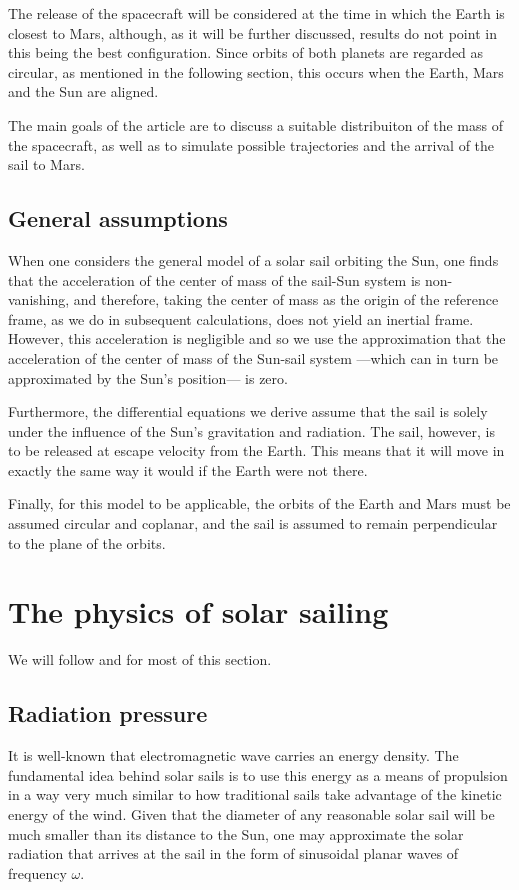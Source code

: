 \documentclass[twocolumn,12pt,a4paper]{article}
\numberwithin{equation}{section}
\begin{document}
The release of the spacecraft will be considered at the time in which the Earth is closest to Mars, although, as it will be further discussed, results do not point in this being the best configuration. Since orbits of both planets are regarded as circular, as mentioned in the following section, this occurs when the Earth, Mars and the Sun are aligned.

The main goals of the article are to discuss a suitable distribuiton of the mass of the spacecraft, as well as to simulate possible trajectories and the arrival of the sail to Mars.

\subsection{General assumptions}
When one considers the general model of a solar sail orbiting the Sun, one finds that the acceleration of the center of mass of the sail-Sun system is non-vanishing, and therefore, taking the center of mass as the origin of the reference frame, as we do in subsequent calculations, does not yield an inertial frame. However, this acceleration is negligible and so we use the approximation that the acceleration of the center of mass of the Sun-sail system ---which can in turn be approximated by the Sun's position--- is zero.

Furthermore, the differential equations we derive assume that the sail is solely under the influence of the Sun's gravitation and radiation. The sail, however, is to be released at escape velocity from the Earth. This means that it will move in exactly the same way it would if the Earth were not there. 

Finally, for this model to be applicable, the orbits of the Earth and Mars must be assumed circular and coplanar, and the sail is assumed to remain perpendicular to the plane of the orbits.

\section{The physics of solar sailing}
We will follow \cite{tsu} and \cite[Ch. 4]{mcinnes} for most of this section.
\subsection{Radiation pressure}
It is well-known that electromagnetic wave carries an energy density. The fundamental idea behind solar sails is to use this energy as a means of propulsion in a way very much similar to how traditional sails take advantage of the kinetic energy of the wind. Given that the diameter of any reasonable solar sail will be much smaller than its distance to the Sun, one may approximate the solar radiation that arrives at the sail in the form of sinusoidal planar waves of frequency \( \omega \).
\end{document}
